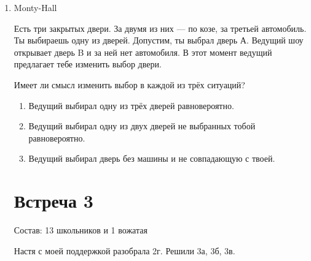 \documentclass[a4paper, 12pt]{article}
\begin{document}
\begin{enumerate}
\item Monty-Hall

Есть три закрытых двери. За двумя из них — по козе, за третьей автомобиль. Ты выбираешь одну из дверей. Допустим, ты выбрал дверь А. Ведущий шоу открывает дверь B и за ней нет автомобиля.
В этот момент ведущий предлагает тебе изменить выбор двери.

Имеет ли смысл изменить выбор в каждой из трёх ситуаций?
\begin{enumerate}
  \item Ведущий выбирал одну из трёх дверей равновероятно.
  \item Ведущий выбирал одну из двух дверей не выбранных тобой равновероятно.
  \item Ведущий выбирал дверь без машины и не совпадающую с твоей.
\end{enumerate}

\newpage
\section{Встреча 3}

Состав: 13 школьников и 1 вожатая

Настя с моей поддержкой разобрала 2г. Решили 3а, 3б, 3в.


\end{enumerate}
\end{document}
